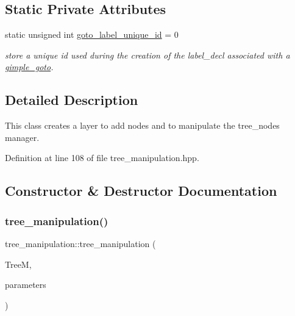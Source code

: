 \subsection*{Static Private Attributes}
\begin{DoxyCompactItemize}
\item 
static unsigned int \hyperlink{classtree__manipulation_a6f392d088e10f48177cbb44989499e4e}{goto\+\_\+label\+\_\+unique\+\_\+id} = 0
\begin{DoxyCompactList}\small\item\em store a unique id used during the creation of the label\+\_\+decl associated with a \hyperlink{structgimple__goto}{gimple\+\_\+goto}. \end{DoxyCompactList}\end{DoxyCompactItemize}


\subsection{Detailed Description}
This class creates a layer to add nodes and to manipulate the tree\+\_\+nodes manager. 

Definition at line 108 of file tree\+\_\+manipulation.\+hpp.



\subsection{Constructor \& Destructor Documentation}
\mbox{\label{classtree__manipulation_ad3de991374ef8c15e18d60fe8ad346e4}} 
\subsubsection{\texorpdfstring{tree\+\_\+manipulation()}{tree\_manipulation()}\hspace{0.1cm}{\footnotesize\ttfamily [1/2]}}
{\footnotesize\ttfamily tree\+\_\+manipulation\+::tree\+\_\+manipulation (\begin{DoxyParamCaption}\item[{const \hyperlink{tree__manager_8hpp_a96ff150c071ce11a9a7a1e40590f205e}{tree\+\_\+manager\+Ref} \&}]{TreeM,  }\item[{const \hyperlink{Parameter_8hpp_a37841774a6fcb479b597fdf8955eb4ea}{Parameter\+Const\+Ref} \&}]{parameters }\end{DoxyParamCaption})}



